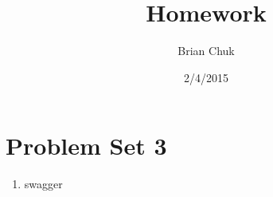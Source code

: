 \documentclass[11pt]{article}
\title{\textbf{Homework}}
\author{Brian Chuk}
\date{2/4/2015}
\begin{document}
\maketitle

\section{Problem Set 3}
\begin{enumerate}

\item swagger
\end{enumerate}
\end{document}
